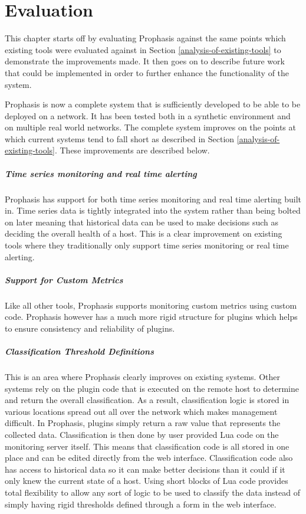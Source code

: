 \documentclass[bsc,deptreport,twoside,parskip,singlespacing,notimes]{infthesis}
\begin{document}
\chapter{Evaluation}
	This chapter starts off by evaluating Prophasis against the same points which
	existing tools were evaluated against in Section
	\ref{analysis-of-existing-tools} to demonstrate the improvements made. It then
	goes on to describe future work that could be implemented in order to further
	enhance the functionality of the system.

	Prophasis is now a complete system that is sufficiently developed to be able to
	be deployed on a network.  It has been tested both in a synthetic environment
	and on multiple real world networks.  The complete system improves on
	the points at which current systems tend to fall short as described in Section
	\ref{analysis-of-existing-tools}. These improvements are described below.

\paragraph*{Time series monitoring and real time alerting}
	Prophasis has support for both time series monitoring and real time alerting
	built in.  Time series data is tightly integrated into the system rather than
	being bolted on later meaning that historical data can be used to make
	decisions such as deciding the overall health of a host.  This is a clear improvement
	on existing tools where they traditionally only support time series monitoring
	or real time alerting.

\paragraph*{Support for Custom Metrics}
	Like all other tools, Prophasis supports monitoring custom metrics using custom
	code.  Prophasis however has a much more rigid structure for plugins which
	helps to ensure consistency and reliability of plugins.

\paragraph*{Classification Threshold Definitions}
	This is an area where Prophasis clearly improves on existing systems.  Other
	systems rely on the plugin code that is executed on the remote host to
	determine and return the overall classification. As a result, classification
	logic is stored in various locations spread out all over the network which makes
	management difficult.  In
	Prophasis, plugins simply return a raw
	value that represents the collected data. Classification is then done by user
	provided Lua code on the monitoring server itself.  This means that
	classification code is all stored in one place and can be edited directly from
	the web interface.  Classification code also has access to historical data so
	it can make better decisions than it could if it only knew the current state of
	a host.  Using short blocks of Lua code provides total flexibility to allow any
	sort of logic to be used to classify the data instead of simply having
	rigid thresholds defined through a form in the web interface.
\end{document}
